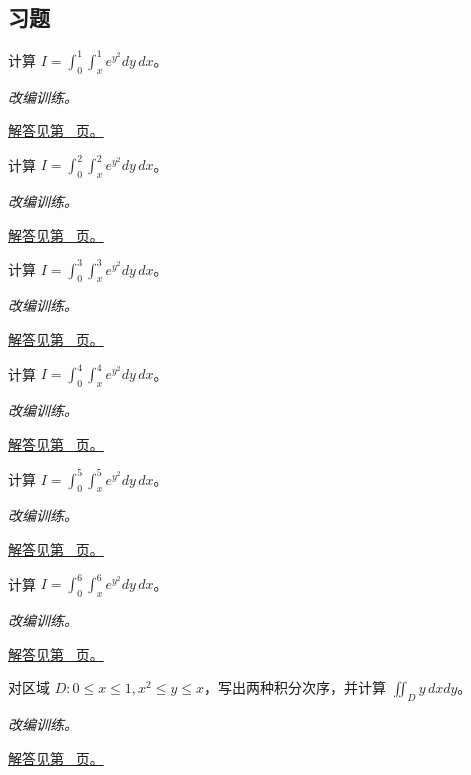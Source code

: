\documentclass[12pt,fontset=fandol]{ctexart}
\begin{document}
\subsection{习题}
\begin{example}[非初等内积分的换序]\label{ex:c37q1}
计算 $I=\displaystyle\int_0^{1}\int_x^{1}e^{y^2}dy\,dx$。
\par\textit{改编训练。}\par\hyperref[ans:c37q1]{解答见第~\pageref{ans:c37q1} 页。}
\end{example}
\begin{example}[非初等内积分的换序]\label{ex:c37q2}
计算 $I=\displaystyle\int_0^{2}\int_x^{2}e^{y^2}dy\,dx$。
\par\textit{改编训练。}\par\hyperref[ans:c37q2]{解答见第~\pageref{ans:c37q2} 页。}
\end{example}
\begin{example}[非初等内积分的换序]\label{ex:c37q3}
计算 $I=\displaystyle\int_0^{3}\int_x^{3}e^{y^2}dy\,dx$。
\par\textit{改编训练。}\par\hyperref[ans:c37q3]{解答见第~\pageref{ans:c37q3} 页。}
\end{example}
\begin{example}[非初等内积分的换序]\label{ex:c37q4}
计算 $I=\displaystyle\int_0^{4}\int_x^{4}e^{y^2}dy\,dx$。
\par\textit{改编训练。}\par\hyperref[ans:c37q4]{解答见第~\pageref{ans:c37q4} 页。}
\end{example}
\begin{example}[非初等内积分的换序]\label{ex:c37q5}
计算 $I=\displaystyle\int_0^{5}\int_x^{5}e^{y^2}dy\,dx$。
\par\textit{改编训练。}\par\hyperref[ans:c37q5]{解答见第~\pageref{ans:c37q5} 页。}
\end{example}
\begin{example}[非初等内积分的换序]\label{ex:c37q6}
计算 $I=\displaystyle\int_0^{6}\int_x^{6}e^{y^2}dy\,dx$。
\par\textit{改编训练。}\par\hyperref[ans:c37q6]{解答见第~\pageref{ans:c37q6} 页。}
\end{example}
\begin{example}[两条曲线之间的换序]\label{ex:c37q7}
对区域 $D:0\le x\le1, x^{2}\le y\le x$，写出两种积分次序，并计算 $\iint_Dy\,dxdy$。
\par\textit{改编训练。}\par\hyperref[ans:c37q7]{解答见第~\pageref{ans:c37q7} 页。}
\end{example}
\end{document}
